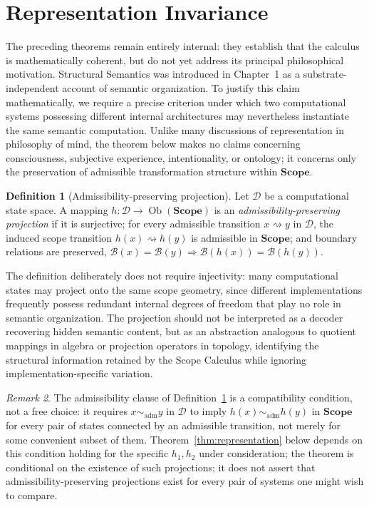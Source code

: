 \documentclass[11pt,twoside,openright]{book}
\numberwithin{equation}{chapter}
\theoremstyle{definition}
\newtheorem{definition}{Definition}[chapter]
\theoremstyle{plain}
\theoremstyle{remark}
\newtheorem{remark}[definition]{Remark}
\theoremstyle{definition}
\newcommand{\CatScope}{\mathbf{Scope}}
\newcommand{\Boundary}{\mathcal{B}}
\newcommand{\Domain}{\mathcal{D}}
\DeclareMathOperator{\Obj}{Ob}
\begin{document}
\section{Representation Invariance}
\label{sec:representation-invariance}

The preceding theorems remain entirely internal: they establish that the
calculus is mathematically coherent, but do not yet address its
principal philosophical motivation. Structural Semantics was introduced
in Chapter~1 as a substrate-independent account of semantic organization.
To justify this claim mathematically, we require a precise criterion
under which two computational systems possessing different internal
architectures may nevertheless instantiate the same semantic computation.
Unlike many discussions of representation in philosophy of mind, the
theorem below makes no claims concerning consciousness, subjective
experience, intentionality, or ontology; it concerns only the
preservation of admissible transformation structure within $\CatScope$.

\begin{definition}[Admissibility-preserving projection]
\label{def:projection}
Let $\Domain$ be a computational state space. A mapping
$h:\Domain\to\Obj(\CatScope)$ is an \emph{admissibility-preserving
projection} if it is surjective; for every admissible transition
$x\rightsquigarrow y$ in $\Domain$, the induced scope transition
$h(x)\rightsquigarrow h(y)$ is admissible in $\CatScope$; and boundary
relations are preserved, $\Boundary(x)=\Boundary(y)\Rightarrow\Boundary(h(x))=\Boundary(h(y))$.
\end{definition}

The definition deliberately does not require injectivity: many
computational states may project onto the same scope geometry, since
different implementations frequently possess redundant internal degrees
of freedom that play no role in semantic organization. The projection
should not be interpreted as a decoder recovering hidden semantic
content, but as an abstraction analogous to quotient mappings in algebra
or projection operators in topology, identifying the structural
information retained by the Scope Calculus while ignoring
implementation-specific variation.

\begin{remark}
The admissibility clause of Definition~\ref{def:projection} is a
compatibility condition, not a free choice: it requires
$x\sim_{\mathrm{adm}}y$ in $\Domain$ to imply
$h(x)\sim_{\mathrm{adm}}h(y)$ in $\CatScope$ for every pair of states
connected by an admissible transition, not merely for some convenient
subset of them. Theorem~\ref{thm:representation} below depends on this
condition holding for the specific $h_1,h_2$ under consideration; the
theorem is conditional on the existence of such projections; it does not
assert that admissibility-preserving projections exist for every pair of
systems one might wish to compare.
\end{remark}
\end{document}

